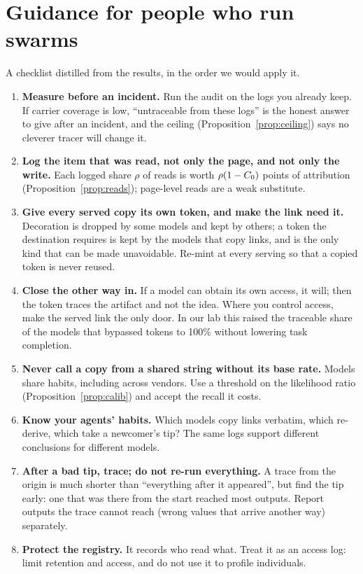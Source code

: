 \section{Guidance for people who run swarms}\label{sec:guidance}

A checklist distilled from the results, in the order we would apply it.

\begin{enumerate}[leftmargin=1.6em]
  \item \textbf{Measure before an incident.} Run the audit on the logs you already keep. If carrier coverage is low, ``untraceable from these logs'' is the honest answer to give after an incident, and the ceiling (Proposition~\ref{prop:ceiling}) says no cleverer tracer will change it.
  \item \textbf{Log the item that was read, not only the page, and not only the write.} Each logged share $\rho$ of reads is worth $\rho(1-C_0)$ points of attribution (Proposition~\ref{prop:reads}); page-level reads are a weak substitute.
  \item \textbf{Give every served copy its own token, and make the link need it.} Decoration is dropped by some models and kept by others; a token the destination requires is kept by the models that copy links, and is the only kind that can be made unavoidable. Re-mint at every serving so that a copied token is never reused.
  \item \textbf{Close the other way in.} If a model can obtain its own access, it will; then the token traces the artifact and not the idea. Where you control access, make the served link the only door. In our lab this raised the traceable share of the models that bypassed tokens to 100\% without lowering task completion.
  \item \textbf{Never call a copy from a shared string without its base rate.} Models share habits, including across vendors. Use a threshold on the likelihood ratio (Proposition~\ref{prop:calib}) and accept the recall it costs.
  \item \textbf{Know your agents' habits.} Which models copy links verbatim, which re-derive, which take a newcomer's tip? The same logs support different conclusions for different models.
  \item \textbf{After a bad tip, trace; do not re-run everything.} A trace from the origin is much shorter than ``everything after it appeared'', but find the tip early: one that was there from the start reached most outputs. Report outputs the trace cannot reach (wrong values that arrive another way) separately.
  \item \textbf{Protect the registry.} It records who read what. Treat it as an access log: limit retention and access, and do not use it to profile individuals.
\end{enumerate}
